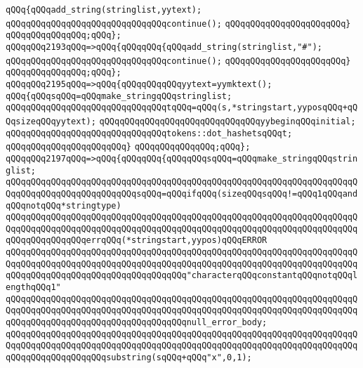 \verb|qQQq{qQQqadd_string(stringlist,yytext);|\newline
\verb|qQQqqQQqqQQqqQQqqQQqqQQqqQQqqQQqcontinue();|\newline
\verb|qQQqqQQqqQQqqQQqqQQqqQQq}|\newline
\verb|qQQqqQQqqQQqqQQq;qQQq};|\newline
\verb|qQQqqQQq2193qQQq=>qQQq{qQQqqQQq{qQQqadd_string(stringlist,"#");|\newline
\verb|qQQqqQQqqQQqqQQqqQQqqQQqqQQqqQQqcontinue();|\newline
\verb|qQQqqQQqqQQqqQQqqQQqqQQq}|\newline
\verb|qQQqqQQqqQQqqQQq;qQQq};|\newline
\verb|qQQqqQQq2195qQQq=>qQQq{qQQqqQQqqQQqyytext=yymktext();|\newline
\verb|qQQq{qQQqsqQQq=qQQqmake_stringqQQqstringlist;|\newline
\verb|qQQqqQQqqQQqqQQqqQQqqQQqqQQqqQQqtqQQq=qQQq(s,*stringstart,yyposqQQq+qQQqsizeqQQqyytext);|\newline
\verb|qQQqqQQqqQQqqQQqqQQqqQQqqQQqqQQqyybeginqQQqinitial;|\newline
\verb|qQQqqQQqqQQqqQQqqQQqqQQqqQQqqQQqtokens::dot_hashetsqQQqt;|\newline
\verb|qQQqqQQqqQQqqQQqqQQqqQQq}|\newline
\verb|qQQqqQQqqQQqqQQq;qQQq};|\newline
\verb|qQQqqQQq2197qQQq=>qQQq{qQQqqQQq{qQQqqQQqsqQQq=qQQqmake_stringqQQqstringlist;|\newline
\verb|qQQqqQQqqQQqqQQqqQQqqQQqqQQqqQQqqQQqqQQqqQQqqQQqqQQqqQQqqQQqqQQqqQQqqQQqqQQqqQQqqQQqqQQqqQQqqQQqsqQQq=qQQqifqQQq(sizeqQQqsqQQq!=qQQq1qQQqandqQQqnotqQQq*stringtype)|\newline
\verb|qQQqqQQqqQQqqQQqqQQqqQQqqQQqqQQqqQQqqQQqqQQqqQQqqQQqqQQqqQQqqQQqqQQqqQQqqQQqqQQqqQQqqQQqqQQqqQQqqQQqqQQqqQQqqQQqqQQqqQQqqQQqqQQqqQQqqQQqqQQqqQQqqQQqqQQqqQQqerrqQQq(*stringstart,yypos)qQQqERROR|\newline
\verb|qQQqqQQqqQQqqQQqqQQqqQQqqQQqqQQqqQQqqQQqqQQqqQQqqQQqqQQqqQQqqQQqqQQqqQQqqQQqqQQqqQQqqQQqqQQqqQQqqQQqqQQqqQQqqQQqqQQqqQQqqQQqqQQqqQQqqQQqqQQqqQQqqQQqqQQqqQQqqQQqqQQqqQQqqQQqqQQq"characterqQQqconstantqQQqnotqQQqlengthqQQq1"|\newline
\verb|qQQqqQQqqQQqqQQqqQQqqQQqqQQqqQQqqQQqqQQqqQQqqQQqqQQqqQQqqQQqqQQqqQQqqQQqqQQqqQQqqQQqqQQqqQQqqQQqqQQqqQQqqQQqqQQqqQQqqQQqqQQqqQQqqQQqqQQqqQQqqQQqqQQqqQQqqQQqqQQqqQQqqQQqqQQqqQQqnull_error_body;|\newline
\verb|qQQqqQQqqQQqqQQqqQQqqQQqqQQqqQQqqQQqqQQqqQQqqQQqqQQqqQQqqQQqqQQqqQQqqQQqqQQqqQQqqQQqqQQqqQQqqQQqqQQqqQQqqQQqqQQqqQQqqQQqqQQqqQQqqQQqqQQqqQQqqQQqqQQqqQQqqQQqqQQqsubstring(sqQQq+qQQq"x",0,1);|\newline
